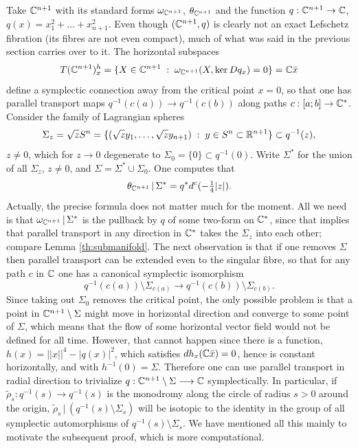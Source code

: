 \documentclass[10pt,letterpaper]{article}
\begin{document}
\proof Take $\mathbb{C}^{n+1}$ with its standard forms $\omega_{\mathbb{C}^{n+1}}$,
$\theta_{\mathbb{C}^{n+1}}$ and the function $q: \mathbb{C}^{n+1} \rightarrow \mathbb{C}$, $q(x) =
x_1^2 + \dots + x_{n+1}^2$. Even though $(\mathbb{C}^{n+1},q)$ is clearly not an exact
Lefschetz fibration (its fibres are not even compact), much of what was said in
the previous section carries over to it. The horizontal subspaces
\begin{equation} \label{eq:horizontal-model}
 T(\mathbb{C}^{n+1})_x^h =
 \{X \in \mathbb{C}^{n+1} \; : \; \omega_{\mathbb{C}^{n+1}}(X,\mathrm{ker}\, Dq_x) = 0\} = \mathbb{C} \bar{x}
\end{equation}
define a symplectic connection away from the critical point $x = 0$, so that
one has parallel transport maps $q^{-1}(c(a)) \rightarrow q^{-1}(c(b))$ along
paths $c: [a;b] \rightarrow \mathbb{C}^*$. Consider the family of Lagrangian spheres
\begin{equation} \label{eq:model-spheres}
\Sigma_z = \sqrt{z}S^n = \{ (\sqrt{z}y_1, \dots, \sqrt{z}y_{n+1}) \; : \; y
\in S^n \subset \mathbb{R}^{n+1} \} \subset q^{-1}(z),
\end{equation}
$z \neq 0$, which for $z \rightarrow 0$ degenerate to $\Sigma_0 = \{0\} \subset
q^{-1}(0)$. Write $\Sigma^*$ for the union of all $\Sigma_z$, $z \neq 0$, and
$\Sigma = \Sigma^* \cup \Sigma_0$. One computes that
\begin{equation} \label{eq:theta-sigma}
 \theta_{\mathbb{C}^{n+1}} \, | \, \Sigma^* = q^* d^c({-\textstyle{\textstyle\frac{1}{4}}}|z|).
\end{equation}
Actually, the precise formula does not matter much for the moment. All we need
is that $\omega_{\mathbb{C}^{n+1}} \,|\, \Sigma^*$ is the pullback by $q$ of some two-form
on $\mathbb{C}^*$, since that implies that parallel transport in any direction in
$\mathbb{C}^*$ takes the $\Sigma_z$ into each other; compare Lemma
\ref{th:submanifold}. The next observation is that if one removes $\Sigma$ then
parallel transport can be extended even to the singular fibre, so that for any
path $c$ in $\mathbb{C}$ one has a canonical symplectic isomorphism
\[
q^{-1}(c(a)) \setminus \Sigma_{c(a)} \rightarrow q^{-1}(c(b)) \setminus
\Sigma_{c(b)}.
\]
Since taking out $\Sigma_0$ removes the critical point, the only possible
problem is that a point in $\mathbb{C}^{n+1} \setminus \Sigma$ might move in horizontal
direction and converge to some point of $\Sigma$, which means that the flow of
some horizontal vector field would not be defined for all time. However, that
cannot happen since there is a function, $h(x) = ||x||^4 - |q(x)|^2$, which
satisfies $dh_x(\mathbb{C}\bar{x}) = 0$, hence is constant horizontally, and with
$h^{-1}(0) = \Sigma$. Therefore one can use parallel transport in radial
direction to trivialize $q: \mathbb{C}^{n+1} \setminus \Sigma \longrightarrow \mathbb{C}$
symplectically. In particular, if $\tilde{\rho}_s: q^{-1}(s) \rightarrow
q^{-1}(s)$ is the monodromy along the circle of radius $s>0$ around the origin,
$\tilde{\rho}_s\,|\,(q^{-1}(s) \setminus \Sigma_s)$ will be isotopic to the
identity in the group of all symplectic automorphisms of $q^{-1}(s) \setminus
\Sigma_s$. We have mentioned all this mainly to motivate the subsequent proof,
which is more computational.
\end{document}
